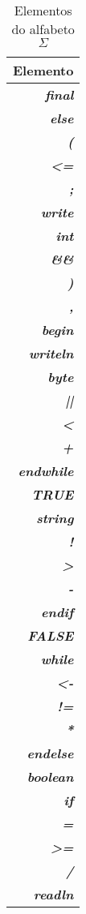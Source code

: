 \begin{table}[!h]
\centering
\caption{Elementos do alfabeto $\Sigma$}
\vspace{0.2cm}
\begin{tabular}{r}
 
Elemento \\ %
\hline                               %
\textit{\textbf{final}}\\
\textit{\textbf{else}}\\
\textit{\textbf{(}}\\
\textit{\textbf{<=}}\\
\textit{\textbf{;}}\\
\textit{\textbf{write}}\\
\textit{\textbf{int}}\\
\textit{\textbf{\&\&}}\\
\textit{\textbf{)}}\\
\textit{\textbf{,}}\\
\textit{\textbf{begin}}\\
\textit{\textbf{writeln}}\\
\textit{\textbf{byte}}\\
\textit{\textbf{||}}\\
\textit{\textbf{<}}\\
\textit{\textbf{+}}\\
\textit{\textbf{endwhile}}\\
\textit{\textbf{TRUE}}\\
\textit{\textbf{string}}\\
\textit{\textbf{!}}\\
\textit{\textbf{>}}\\
\textit{\textbf{-}}\\
\textit{\textbf{endif}}\\
\textit{\textbf{FALSE}}\\
\textit{\textbf{while}}\\
\textit{\textbf{<-}}\\
\textit{\textbf{!=}}\\
\textit{\textbf{*}}\\
\textit{\textbf{endelse}}\\
\textit{\textbf{boolean}}\\
\textit{\textbf{if}}\\
\textit{\textbf{=}}\\
\textit{\textbf{>=}}\\
\textit{\textbf{/}}\\
\textit{\textbf{readln}}\\
\end{tabular}
\end{table}



